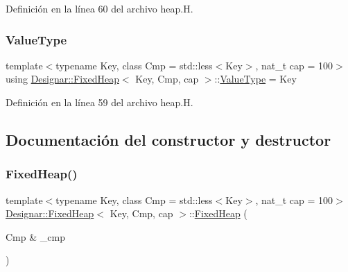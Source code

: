 Definición en la línea 60 del archivo heap.\+H.

\mbox{\label{class_designar_1_1_fixed_heap_a33def2622f3d95c165abf62ce2edcb73}} 
\subsubsection{\texorpdfstring{Value\+Type}{ValueType}}
{\footnotesize\ttfamily template$<$typename Key, class Cmp = std\+::less$<$\+Key$>$, nat\+\_\+t cap = 100$>$ \\
using \hyperlink{class_designar_1_1_fixed_heap}{Designar\+::\+Fixed\+Heap}$<$ Key, Cmp, cap $>$\+::\hyperlink{class_designar_1_1_fixed_heap_a33def2622f3d95c165abf62ce2edcb73}{Value\+Type} =  Key}



Definición en la línea 59 del archivo heap.\+H.



\subsection{Documentación del constructor y destructor}
\mbox{\label{class_designar_1_1_fixed_heap_ac5dfd33a9ee1cedaad907c51afdf351d}} 
\subsubsection{\texorpdfstring{Fixed\+Heap()}{FixedHeap()}\hspace{0.1cm}{\footnotesize\ttfamily [1/4]}}
{\footnotesize\ttfamily template$<$typename Key, class Cmp = std\+::less$<$\+Key$>$, nat\+\_\+t cap = 100$>$ \\
\hyperlink{class_designar_1_1_fixed_heap}{Designar\+::\+Fixed\+Heap}$<$ Key, Cmp, cap $>$\+::\hyperlink{class_designar_1_1_fixed_heap}{Fixed\+Heap} (\begin{DoxyParamCaption}\item[{Cmp \&}]{\+\_\+cmp }\end{DoxyParamCaption})\hspace{0.3cm}{\ttfamily [inline]}}



